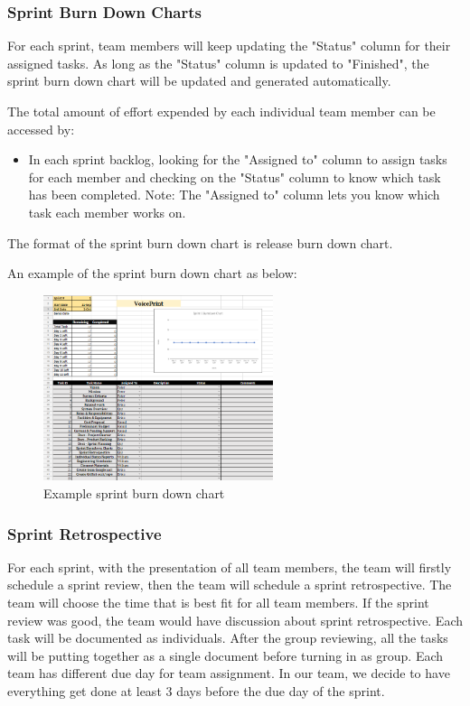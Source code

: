 \subsubsection{Sprint Burn Down Charts}
For each sprint, team members will keep updating the "Status" column for their assigned tasks. As long as the "Status" column is updated to "Finished", the sprint burn down chart will be updated and generated automatically. 

The total amount of effort expended by each individual team member can be accessed by:

\begin{itemize}
    
\item In each sprint backlog, looking for the "Assigned to" column to assign tasks for each member and checking on the "Status" column to know which task has been completed. 
Note: The "Assigned to" column lets you know which task each member works on.

\end{itemize}

The format of the sprint burn down chart is release burn down chart.

An example of the sprint burn down chart as below:

\begin{figure}[h!]
	\centering
   	\includegraphics[width=0.6\textwidth]{images/Chart.png}
    \caption{Example sprint burn down chart}
\end{figure}

\subsubsection{Sprint Retrospective}
For each sprint, with the presentation of all team members, the team will firstly schedule a sprint review, then the team will schedule a sprint retrospective. The team will choose the time that is best fit for all team members. If the sprint review was good, the team would have discussion about sprint retrospective. Each task will be documented as individuals. After the group reviewing, all the tasks will be putting together as a single document before turning in as group. Each team has different due day for team assignment. In our team, we decide to have everything get done at least 3 days before the due day of the sprint.

